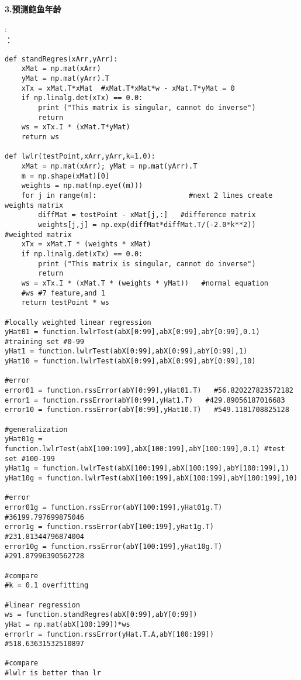 \noindent\textbf{3.预测鲍鱼年龄}\par
{}:\\
：
\begin{lstlisting}
def standRegres(xArr,yArr):
    xMat = np.mat(xArr)
    yMat = np.mat(yArr).T
    xTx = xMat.T*xMat  #xMat.T*xMat*w - xMat.T*yMat = 0
    if np.linalg.det(xTx) == 0.0:
        print ("This matrix is singular, cannot do inverse")
        return
    ws = xTx.I * (xMat.T*yMat)
    return ws

def lwlr(testPoint,xArr,yArr,k=1.0):
    xMat = np.mat(xArr); yMat = np.mat(yArr).T
    m = np.shape(xMat)[0]
    weights = np.mat(np.eye((m)))
    for j in range(m):                      #next 2 lines create weights matrix
        diffMat = testPoint - xMat[j,:]   #difference matrix
        weights[j,j] = np.exp(diffMat*diffMat.T/(-2.0*k**2))   #weighted matrix
    xTx = xMat.T * (weights * xMat)
    if np.linalg.det(xTx) == 0.0:
        print ("This matrix is singular, cannot do inverse")
        return
    ws = xTx.I * (xMat.T * (weights * yMat))   #normal equation
    #ws #7 feature,and 1
    return testPoint * ws

#locally weighted linear regression
yHat01 = function.lwlrTest(abX[0:99],abX[0:99],abY[0:99],0.1) #training set #0-99
yHat1 = function.lwlrTest(abX[0:99],abX[0:99],abY[0:99],1)
yHat10 = function.lwlrTest(abX[0:99],abX[0:99],abY[0:99],10)

#error
error01 = function.rssError(abY[0:99],yHat01.T)   #56.820227823572182
error1 = function.rssError(abY[0:99],yHat1.T)   #429.89056187016683
error10 = function.rssError(abY[0:99],yHat10.T)   #549.1181708825128

#generalization
yHat01g = function.lwlrTest(abX[100:199],abX[100:199],abY[100:199],0.1) #test set #100-199
yHat1g = function.lwlrTest(abX[100:199],abX[100:199],abY[100:199],1)
yHat10g = function.lwlrTest(abX[100:199],abX[100:199],abY[100:199],10)

#error
error01g = function.rssError(abY[100:199],yHat01g.T)   #36199.797699875046
error1g = function.rssError(abY[100:199],yHat1g.T)   #231.81344796874004
error10g = function.rssError(abY[100:199],yHat10g.T)   #291.87996390562728

#compare
#k = 0.1 overfitting

#linear regression
ws = function.standRegres(abX[0:99],abY[0:99])
yHat = np.mat(abX[100:199])*ws
errorlr = function.rssError(yHat.T.A,abY[100:199])   #518.63631532510897

#compare
#lwlr is better than lr
\end{lstlisting}

